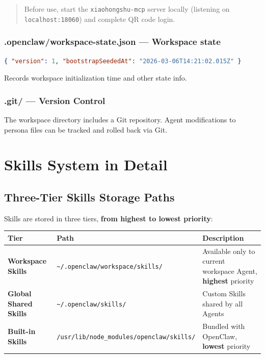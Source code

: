 \begin{quote}
Before use, start the \texttt{xiaohongshu-mcp}  server locally (listening on \texttt{localhost:18060}) and complete QR code login.
\end{quote}

\subsubsection{.openclaw/workspace-state.json --- Workspace state}


\begin{lstlisting}[language=json]
{ "version": 1, "bootstrapSeededAt": "2026-03-06T14:21:02.015Z" }
\end{lstlisting}

Records workspace initialization time and other state info.

\subsubsection{.git/ --- Version Control}


The workspace directory includes a Git repository. Agent modifications to persona files can be tracked and rolled back via Git.

\hrulefill

\section{Skills System in Detail}


\subsection{Three-Tier Skills Storage Paths}


Skills are stored in three tiers, \textbf{from highest to lowest priority}:

\begin{table}[h]
\centering
\small
\begin{tabular}{|l|l|l|}
\hline
Tier & Path & Description \\
\hline
\textbf{Workspace Skills} & \texttt{\textasciitilde{}/.openclaw/workspace/skills/} & Available only to current workspace Agent, \textbf{highest} priority \\
\hline
\textbf{Global Shared Skills} & \texttt{\textasciitilde{}/.openclaw/skills/} & Custom Skills shared by all Agents \\
\hline
\textbf{Built-in Skills} & \texttt{/usr/lib/node\_modules/openclaw/skills/} & Bundled with OpenClaw, \textbf{lowest} priority \\
\hline
\end{tabular}
\end{table}

